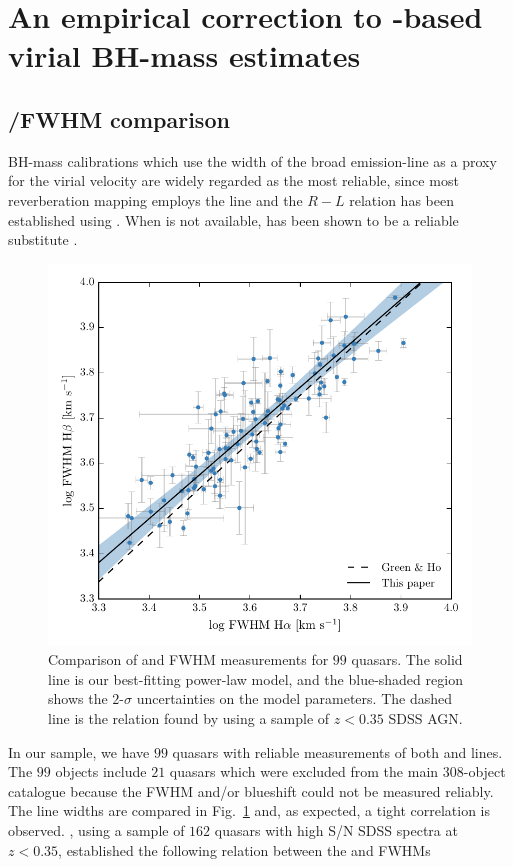 \section{An empirical correction to -based virial BH-mass estimates}

\subsection{\hans/\hb FWHM comparison}
\label{sec:hahbcomparison}

BH-mass calibrations which use the width of the broad \hb emission-line as a proxy for the virial velocity are widely regarded as the most reliable, since most reverberation mapping employs the \hb line and the $R-L$ relation has been established using \hbns.
When \hb is not available, \ha has been shown to be a reliable substitute \citep[e.g.][]{greene05b,shen11,shen12}. 

\begin{figure}
    \centering 
    \includegraphics[width=0.8\columnwidth]{figures/chapter03/ha_hb_width_comparison.pdf} 
    \caption[{Comparison of \ha and \hb FWHM measurements for $99$ quasars.}]{Comparison of \ha and \hb FWHM measurements for $99$ quasars. The solid line is our best-fitting power-law model, and the blue-shaded region shows the $2$-$\sigma$ uncertainties on the model parameters. The dashed line is the relation found by \citet{greene05b} using a sample of $z<0.35$ SDSS AGN.} 
    \label{fig:hahbcomp}
\end{figure}

In our sample, we have $99$ quasars with reliable measurements of both \ha and \hb lines. 
The $99$ objects include $21$ quasars which were excluded from the main $308$-object catalogue because the  FWHM and/or blueshift could not be measured reliably. 
The line widths are compared in Fig.~\ref{fig:hahbcomp} and, as expected, a tight correlation is observed.  
\citet{greene05b}, using a sample of $162$ quasars with high S/N SDSS spectra at $z < 0.35$, established the following relation between the \ha and \hb FWHMs

